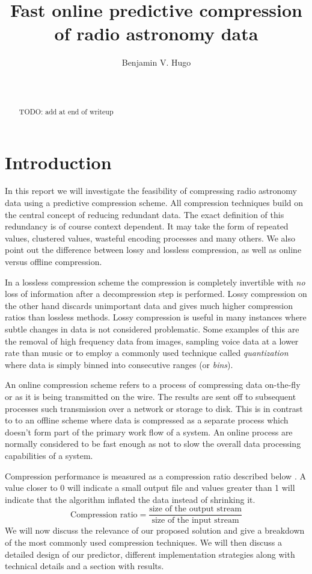 \documentclass{acm_proc_article-sp}
\title{Fast online predictive compression of radio astronomy data}
\author{
\alignauthor
Benjamin V. Hugo\\
       \affaddr{Department of Computer Science}\\
       \affaddr{University of Cape Town}\\
       \email{bennahugo@aol.com}
}
\begin{document}
\maketitle
\begin{abstract}
 {\color{red}TODO: add at end of writeup}
\end{abstract}

\section{Introduction}
In this report we will investigate the feasibility of compressing radio astronomy data using a predictive compression scheme. All compression techniques
build on the central concept of reducing redundant data. The exact definition of this redundancy is of course context dependent. It may take the form of 
repeated values, clustered values, wasteful encoding processes and many others. We also point out the difference between lossy and lossless compression, as
well as online versus offline compression.

In a lossless compression scheme the compression is completely invertible with \textit{no} loss of information after a decompression step is performed. Lossy
compression on the other hand discards unimportant data and gives much higher compression ratios than lossless methods. Lossy compression is useful in many
instances where subtle changes in data is not considered problematic. Some examples of this are the removal of high frequency data from images, sampling 
voice data at a lower rate than music or to employ a commonly used technique called \textit{quantization} where data is simply binned into consecutive ranges 
(or \textit{bins}).

An online compression scheme refers to a process of compressing data on-the-fly or as it is being transmitted on the wire. The results are sent off to subsequent 
processes such transmission over a network or storage to disk. This is in contrast to to an offline scheme where data is compressed as a separate process which doesn't
form part of the primary work flow of a system. An online process are normally considered to be fast enough as not to slow the overall data processing capabilities of 
a system.

Compression performance is measured as a compression ratio described below \cite[p. 10]{salomon2004data}. A value closer to 0 will indicate a small output file and values greater than 1 will indicate
that the algorithm inflated the data instead of shrinking it.
\begin{equation*}
 \text{Compression ratio} = \frac{\text{size of the output stream}}{\text{size of the input stream}}
\end{equation*}
We will now discuss the relevance of our proposed solution and give a breakdown of the most commonly used compression techniques. We will then discuss a detailed design
of our predictor, different implementation strategies along with technical details and a section with results.
\end{document}
